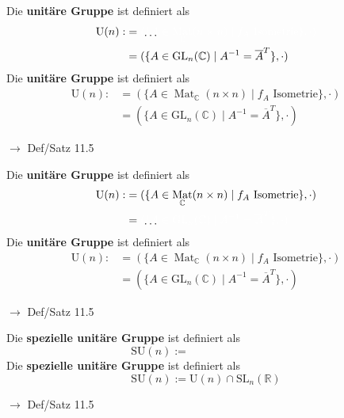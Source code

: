 \documentclass[11pt]{article}
\renewcommand{\cite}[1]{\par\bigskip\hfill{\color{gray}\tiny\(\to\) #1}}
\newcommand{\CC}{\mathbb{C}}
\newcommand{\RR}{\mathbb{R}}
\DeclareMathOperator{\Mat}{Mat}
\newcommand{\hide}[1]{\parbox{0cm}{\raisebox{-7pt}[0cm]{\dots}}\color{white}#1\color{black}}
\let\olddots\dots
\renewcommand{\dots}{\,\olddots\,}
\newenvironment{field}{}{\newpage}
\newif\ifnote
\newenvironment{note}{\notetrue}{\notefalse}
\newcommand{\localtag}{}
\newcommand{\globaltag}{}
\newcommand{\uuid}{}
\newcommand{\tags}[1]{
    \ifnote
        \renewcommand{\localtag}{#1}
    \else
        \renewcommand{\globaltag}{#1}
    \fi
    }
\newcommand{\xplain}[1]{\renewcommand{\uuid}{#1}}
\begin{document}
\begin{note}
    \tags{Def Satz}
    \xplain{a0b73478-c30d-11ec-9d64-0242ac120002}
    \begin{field}
        Die \textbf{unitäre Gruppe} ist definiert als
        \begin{align*}
            \text{U}(n) :&= \hide{(\{A\in\Mat_{\CC}(n\times n) \mid f_A \text{ Isometrie}\}, \cdot)}\\
            &= (\{A \in \text{GL}_n(\CC) \mid A^{-1} = \overline{A}^T\}, \cdot)
        \end{align*}
    \end{field}
    \begin{field}
        Die \textbf{unitäre Gruppe} ist definiert als
        \begin{align*}
            \text{U}(n) :&= (\{A\in\Mat_{\CC}(n\times n) \mid f_A \text{ Isometrie}\}, \cdot)\\
            &= (\{A \in \text{GL}_n(\CC) \mid A^{-1} = \overline{A}^T\}, \cdot)
        \end{align*}
        \cite{Def/Satz 11.5}
    \end{field}

    \begin{field}
        Die \textbf{unitäre Gruppe} ist definiert als
        \begin{align*}
            \text{U}(n) :&= (\{A\in\Mat_{\CC}(n\times n) \mid f_A \text{ Isometrie}\}, \cdot)\\
            &= \hide{(\{A \in \text{GL}_n(\CC) \mid A^{-1} = \overline{A}^T\}, \cdot)}
        \end{align*}
    \end{field}
    \begin{field}
        Die \textbf{unitäre Gruppe} ist definiert als
        \begin{align*}
            \text{U}(n) :&= (\{A\in\Mat_{\CC}(n\times n) \mid f_A \text{ Isometrie}\}, \cdot)\\
            &= (\{A \in \text{GL}_n(\CC) \mid A^{-1} = \overline{A}^T\}, \cdot)
        \end{align*}
        \cite{Def/Satz 11.5}
    \end{field}

    \begin{field}
        Die \textbf{spezielle unitäre Gruppe} ist definiert als
        \[\text{SU}(n) := \phantom{\text{U}(n) \cap \text{SL}_n(\CC)}\]
    \end{field}
    \begin{field}
        Die \textbf{spezielle unitäre Gruppe} ist definiert als
        \[\text{SU}(n) := \text{U}(n) \cap \text{SL}_n(\RR)\]
        \cite{Def/Satz 11.5}
    \end{field}
\end{note}
\end{document}
